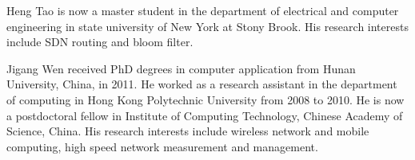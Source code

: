 \documentclass[10pt,journal,compsoc]{IEEEtran}
\begin{document}
\begin{IEEEbiography}{Heng Tao}
 is now a master student in the department of electrical and computer engineering in state university of New York at
Stony Brook. His research interests include SDN routing and bloom filter.
\end{IEEEbiography}
\begin{IEEEbiography}{Jigang Wen}
received PhD degrees in computer application from Hunan University, China, in 2011. He worked as a research assistant in the department of computing in Hong Kong Polytechnic University from 2008 to 2010. He is now a postdoctoral fellow
in Institute of Computing Technology, Chinese Academy of Science, China. His research interests include wireless network and mobile computing, high speed network measurement and management.
\end{IEEEbiography}
\end{document}
